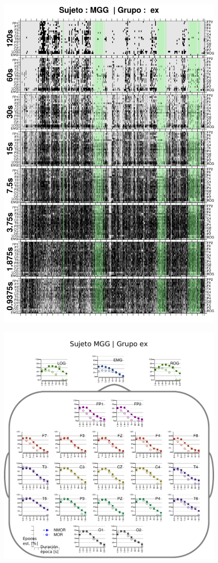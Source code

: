 \begin{figure}
\centering
\includegraphics[width=0.9\linewidth]
{./img_ejemplos/MGNA5SUE_comp_est_.png} 
\end{figure}

\begin{figure}
\centering
\includegraphics[width=.9\linewidth]{./img_resultados/cabeza_MGG.pdf}
\end{figure}

